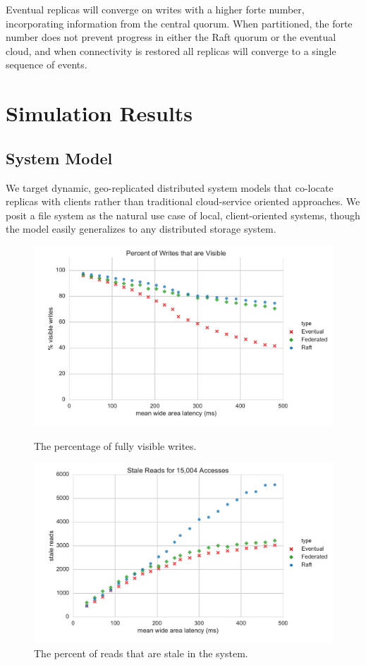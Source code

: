 \documentclass[conference,letterpaper]{IEEEtran}
\begin{document}
Eventual replicas will converge on writes with a higher forte number, incorporating
information from the central quorum.
When partitioned, the forte number does not prevent progress in either the Raft quorum or
the eventual cloud, and when connectivity is restored all replicas will
converge to a single sequence of events.

\section{Simulation Results}

\subsection{System Model}

We target dynamic, geo-replicated distributed system models that co-locate replicas with
clients rather than traditional cloud-service oriented approaches.
We posit a file system as the natural use case of
local, client-oriented systems, though the model easily generalizes to any
distributed storage system.

\begin{figure}[t]
    \centering
      \includegraphics[width=\linewidth]{figures/latency/percent_visible_writes}
      \caption{The percentage of fully visible writes.}\label{fig:visible_writes}
    \endminipage\hfill
      \includegraphics[width=\linewidth]{figures/latency/stale_reads}
      \caption{The percent of reads that are stale in the system.}\label{fig:latency_stale_reads}
    \endminipage
\end{figure}
\end{document}
